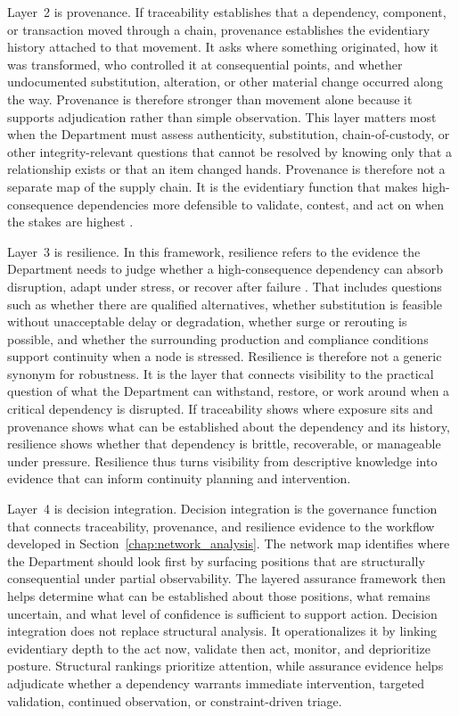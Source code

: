 Layer~2 is provenance. If traceability establishes that a dependency, component, or transaction moved through a chain, provenance establishes the evidentiary history attached to that movement. It asks where something originated, how it was transformed, who controlled it at consequential points, and whether undocumented substitution, alteration, or other material change occurred along the way. Provenance is therefore stronger than movement alone because it supports adjudication rather than simple observation. This layer matters most when the Department must assess authenticity, substitution, chain-of-custody, or other integrity-relevant questions that cannot be resolved by knowing only that a relationship exists or that an item changed hands. Provenance is therefore not a separate map of the supply chain. It is the evidentiary function that makes high-consequence dependencies more defensible to validate, contest, and act on when the stakes are highest \parencite{ch5_dodi520044,ch5_dfars2522467007,ch5_dfars2522467008}.

Layer~3 is resilience. In this framework, resilience refers to the evidence the Department needs to judge whether a high-consequence dependency can absorb disruption, adapt under stress, or recover after failure \parencite{ch5_dod2022_supplychains,ch5_dodi500085,ch5_dodi424515}. That includes questions such as whether there are qualified alternatives, whether substitution is feasible without unacceptable delay or degradation, whether surge or rerouting is possible, and whether the surrounding production and compliance conditions support continuity when a node is stressed. Resilience is therefore not a generic synonym for robustness. It is the layer that connects visibility to the practical question of what the Department can withstand, restore, or work around when a critical dependency is disrupted. If traceability shows where exposure sits and provenance shows what can be established about the dependency and its history, resilience shows whether that dependency is brittle, recoverable, or manageable under pressure. Resilience thus turns visibility from descriptive knowledge into evidence that can inform continuity planning and intervention.

Layer~4 is decision integration. Decision integration is the governance function that connects traceability, provenance, and resilience evidence to the workflow developed in Section~\ref{chap:network_analysis}. The network map identifies where the Department should look first by surfacing positions that are structurally consequential under partial observability. The layered assurance framework then helps determine what can be established about those positions, what remains uncertain, and what level of confidence is sufficient to support action. Decision integration does not replace structural analysis. It operationalizes it by linking evidentiary depth to the act now, validate then act, monitor, and deprioritize posture. Structural rankings prioritize attention, while assurance evidence helps adjudicate whether a dependency warrants immediate intervention, targeted validation, continued observation, or constraint-driven triage.

